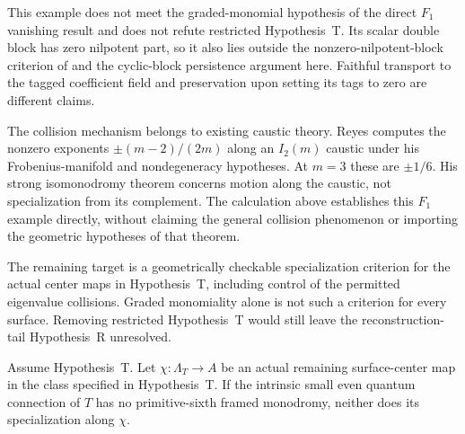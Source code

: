 This example does not meet the graded-monomial hypothesis of the direct
\(F_1\) vanishing result and does not refute restricted Hypothesis~T.
Its scalar double block has zero nilpotent part, so it also lies outside the
nonzero-nilpotent-block criterion of \cite{RuddM1} and the cyclic-block
persistence argument here. Faithful transport to the tagged coefficient
field and preservation upon setting its tags to zero are different claims.

The collision mechanism belongs to existing caustic theory.
Reyes \cite[Proposition~5.3]{ReyesCaustic} computes the nonzero exponents
\(\pm(m-2)/(2m)\) along an \(I_2(m)\) caustic under his Frobenius-manifold
and nondegeneracy hypotheses. At \(m=3\) these are \(\pm1/6\).
His strong isomonodromy theorem concerns motion along the caustic, not
specialization from its complement. The calculation above establishes this
\(F_1\) example directly, without claiming the general collision phenomenon
or importing the geometric hypotheses of that theorem.

The remaining target is a geometrically checkable specialization criterion
for the actual center maps in Hypothesis~T, including control of the
permitted eigenvalue collisions. Graded monomiality alone is not such a
criterion for every surface. Removing restricted Hypothesis~T would still
leave the reconstruction-tail Hypothesis~R unresolved.

\begin{lemma}
\label{lem:divisor-tagging}
%
%
Assume Hypothesis~T.
Let \(\chi:\Lambda_T\to A\) be an actual remaining surface-center map
in the class specified in Hypothesis~T. If the intrinsic
small even quantum connection of \(T\) has no primitive-sixth framed
monodromy, neither does its specialization along \(\chi\).
\end{lemma}


